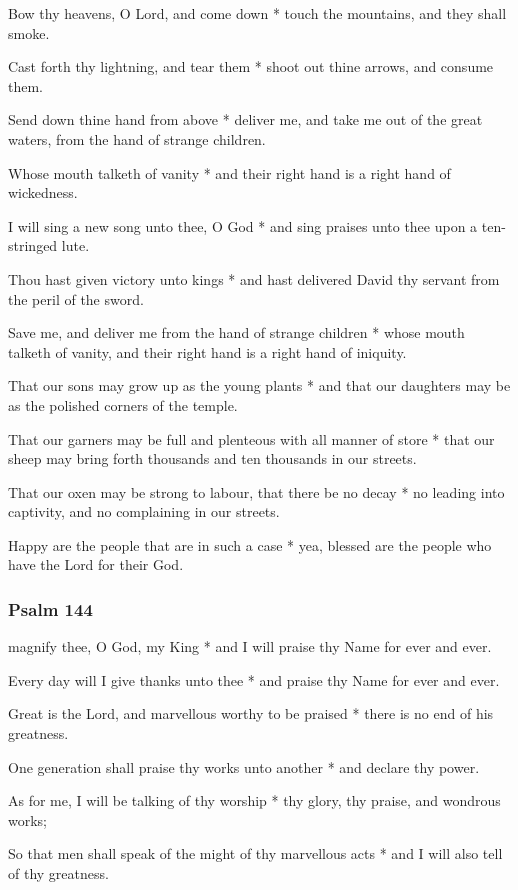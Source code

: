 Bow thy heavens, O Lord, and come down * touch the mountains, and they shall smoke.

Cast forth thy lightning, and tear them * shoot out thine arrows, and consume them.

Send down thine hand from above * deliver me, and take me out of the great waters, from the hand of strange children.

Whose mouth talketh of vanity * and their right hand is a right hand of wickedness.

I will sing a new song unto thee, O God * and sing praises unto thee upon a ten-stringed lute.

Thou hast given victory unto kings * and hast delivered David thy servant from the peril of the sword.

Save me, and deliver me from the hand of strange children * whose mouth talketh of vanity, and their right hand is a right hand of iniquity.

That our sons may grow up as the young plants * and that our daughters may be as the polished corners of the temple.

That our garners may be full and plenteous with all manner of store * that our sheep may bring forth thousands and ten thousands in our streets.

That our oxen may be strong to labour, that there be no decay * no leading into captivity, and no complaining in our streets.

Happy are the people that are in such a case * yea, blessed are the people who have the Lord for their God.

\subsubsection{Psalm 144}


 magnify thee, O God, my King * and I will praise thy Name for ever and ever.

Every day will I give thanks unto thee * and praise thy Name for ever and ever.

Great is the Lord, and marvellous worthy to be praised * there is no end of his greatness.

One generation shall praise thy works unto another * and declare thy power.

As for me, I will be talking of thy worship * thy glory, thy praise, and wondrous works;

So that men shall speak of the might of thy marvellous acts * and I will also tell of thy greatness.

